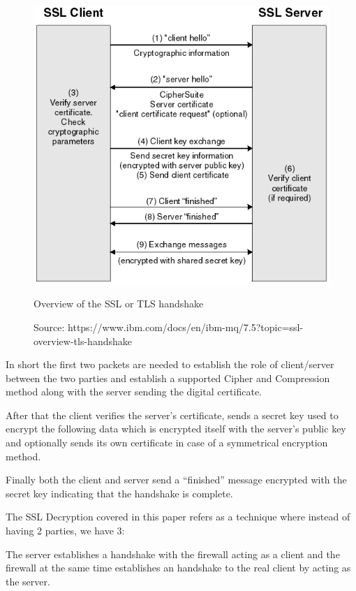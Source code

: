 \begin{figure}[!hb]
 \centering
 \includegraphics[width=13cm]{img/ssl_handshake.png}
 \caption{Overview of the SSL or TLS handshake}
 \caption*{Source: https://www.ibm.com/docs/en/ibm-mq/7.5?topic=ssl-overview-tls-handshake}
 \label{SSL handshake}
\end{figure}

In short the first two packets are needed to establish the role of client/server between the two parties and establish a supported Cipher and Compression method along with the server sending the digital certificate.

After that the client verifies the server's certificate, sends a secret key used to encrypt the following data which is encrypted itself with the server's public key and optionally sends its own certificate in case of a symmetrical encryption method.

Finally both the client and server send a ``finished'' message encrypted with the secret key indicating that the handshake is complete.

The SSL Decryption covered in this paper refers as a technique where instead of having  2 parties, we have 3:

The server establishes a handshake with the firewall acting as a client and the firewall at the same time establishes an handshake to the real client by acting as the server.

